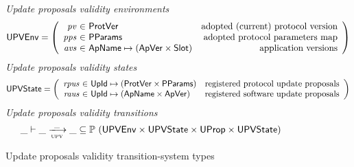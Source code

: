 \begin{figure}[htb]
  \emph{Update proposals validity environments}
  \begin{equation*}
    \UPVEnv =
    \left(
      \begin{array}{r@{~\in~}lr}
        \var{pv} & \ProtVer & \text{adopted (current) protocol version}\\
        \var{pps} & \PPMMap & \text{adopted protocol parameters map}\\
        \var{avs} & \ApName \mapsto (\ApVer \times \Slot)
        & \text{application versions}\\
      \end{array}
    \right)
  \end{equation*}
  \emph{Update proposals validity states}
  \begin{equation*}
    \UPVState
    = \left(
      \begin{array}{r@{~\in~}lr}
        \var{rpus} & \UPropId \mapsto (\ProtVer \times \PPMMap)
        & \text{registered protocol update proposals}\\
        \var{raus} & \UPropId \mapsto (\ApName \times \ApVer)
        & \text{registered software update proposals}\\
      \end{array}
    \right)
  \end{equation*}
  \emph{Update proposals validity transitions}
    \begin{equation*}
    \var{\_} \vdash
    \var{\_} \trans{upv}{\_} \var{\_}
    \subseteq \powerset (\UPVEnv \times \UPVState \times \UProp \times \UPVState)
  \end{equation*}
  \caption{Update proposals validity transition-system types}
  \label{fig:ts-types:up-validity}
\end{figure}

